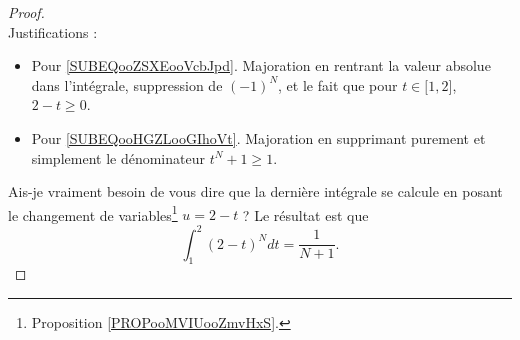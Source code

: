 \begin{proof}
\begin{subequations}
	\end{subequations}
	Justifications :
	\begin{itemize}
		\item Pour \ref{SUBEQooZSXEooVcbJpd}. Majoration en rentrant la valeur absolue dans l'intégrale, suppression de \( (-1)^N\), et le fait que pour \( t\in \mathopen[ 1 , 2 \mathclose]\), \( 2-t\geq 0\).
		\item Pour \ref{SUBEQooHGZLooGIhoVt}. Majoration en supprimant purement et simplement le dénominateur \( t^N+1\geq 1\).
	\end{itemize}
	Ais-je vraiment besoin de vous dire que la dernière intégrale se calcule en posant le changement de variables\footnote{Proposition \ref{PROPooMVIUooZmvHxS}.} \( u=2-t\) ? Le résultat est que
	\begin{equation}
		\int_1^2(2-t)^Ndt=\frac{1}{ N+1 }.
	\end{equation}
\end{proof}

